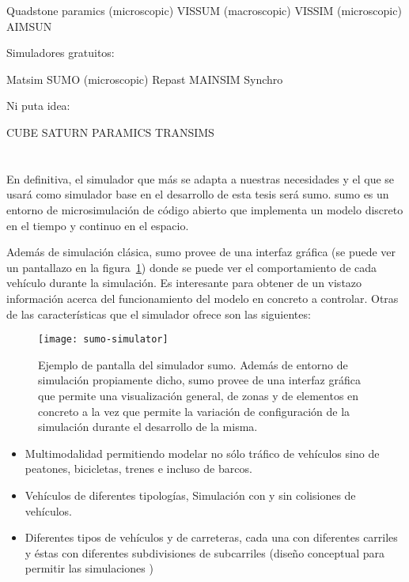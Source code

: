 Quadstone paramics (microscopic)
VISSUM (macroscopic)
VISSIM (microscopic)
AIMSUN

Simuladores gratuitos:

Matsim
SUMO (microscopic)
Repast
MAINSIM
Synchro

Ni puta idea:

CUBE
SATURN
PARAMICS
TRANSIMS

\section{}

En definitiva, el simulador que más se adapta a nuestras necesidades y el que se usará como simulador base en el desarrollo de esta tesis será \gls{sumo}. \gls{sumo} es un entorno de microsimulación de código abierto que implementa un modelo discreto en el tiempo y continuo en el espacio.

Además de simulación clásica, \gls{sumo} provee de una interfaz gráfica (se puede ver un pantallazo en la figura~\ref{fig:sumo-simulator}) donde se puede ver el comportamiento de cada vehículo durante la simulación. Es interesante para obtener de un vistazo información acerca del funcionamiento del modelo en concreto a controlar. Otras de las características que el simulador ofrece son las siguientes:

\begin{figure}
	\texttt{[image: sumo-simulator]}
	\caption{Ejemplo de pantalla del simulador \gls{sumo}. Además de entorno de simulación propiamente dicho, \gls{sumo} provee de una interfaz gráfica que permite una visualización general, de zonas y de elementos en concreto a la vez que permite la variación de configuración de la simulación durante el desarrollo de la misma.}
	\label{fig:sumo-simulator}
\end{figure}

\begin{itemize}
	\item Multimodalidad permitiendo modelar no sólo tráfico de vehículos sino de peatones, bicicletas, trenes e incluso de barcos.
	\item Vehículos de diferentes tipologías, Simulación con y sin colisiones de vehículos.
	\item Diferentes tipos de vehículos y de carreteras, cada una con diferentes carriles y éstas con diferentes subdivisiones de subcarriles (diseño conceptual para permitir las simulaciones )
\end{itemize}

